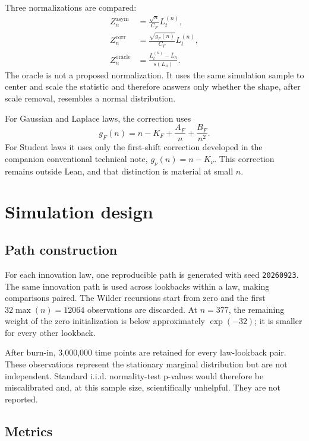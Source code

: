 \documentclass[10pt]{article}
\begin{document}
Three normalizations are compared:
\begin{align}
Z_{n}^{\mathrm{asym}}&=\frac{\sqrt n}{C_F}L_t^{(n)},\\
Z_{n}^{\mathrm{corr}}&=\frac{\sqrt{g_F(n)}}{C_F}L_t^{(n)},\\
Z_{n}^{\mathrm{oracle}}&=
\frac{L_t^{(n)}-\overline L_n}{s(L_n)}.
\end{align}
The oracle is not a proposed normalization.  It uses the same simulation sample
to center and scale the statistic and therefore answers only whether the shape,
after scale removal, resembles a normal distribution.

For Gaussian and Laplace laws, the correction uses
\begin{equation}
g_F(n)=n-K_F+\frac{A_F}{n}+\frac{B_F}{n^2}.
\end{equation}
For Student laws it uses only the first-shift correction developed in the
companion conventional technical note,
\(g_\nu(n)=n-K_\nu\).  This correction remains outside Lean, and that
distinction is material at small \(n\).



\section{Simulation design}

\subsection{Path construction}

For each innovation law, one reproducible path is generated with seed
\texttt{20260923}.  The same innovation path is used across lookbacks within a
law, making comparisons paired.  The Wilder recursions start from zero and the
first \(32\max(n)=12064\) observations are discarded.  At \(n=377\), the
remaining weight of the zero initialization is below approximately
\(\exp(-32)\); it is smaller for every other lookback.

After burn-in, 3,000,000 time points are retained for every law-lookback pair.
These observations represent the stationary marginal distribution but are not
independent.  Standard i.i.d. normality-test p-values would therefore be
miscalibrated and, at this sample size, scientifically unhelpful.  They are not
reported.

\subsection{Metrics}
\end{document}
